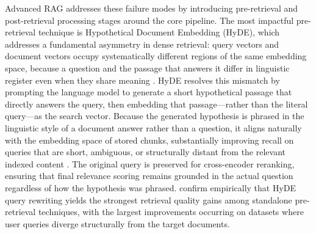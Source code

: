Advanced RAG addresses these failure modes by introducing pre-retrieval and post-retrieval processing stages around the core pipeline. The most impactful pre-retrieval technique is Hypothetical Document Embedding (HyDE), which addresses a fundamental asymmetry in dense retrieval: query vectors and document vectors occupy systematically different regions of the same embedding space, because a question and the passage that answers it differ in linguistic register even when they share meaning \cite{gao2023hyde}. HyDE resolves this mismatch by prompting the language model to generate a short hypothetical passage that directly answers the query, then embedding that passage—rather than the literal query—as the search vector. Because the generated hypothesis is phrased in the linguistic style of a document answer rather than a question, it aligns naturally with the embedding space of stored chunks, substantially improving recall on queries that are short, ambiguous, or structurally distant from the relevant indexed content \cite{gao2023hyde}. The original query is preserved for cross-encoder reranking, ensuring that final relevance scoring remains grounded in the actual question regardless of how the hypothesis was phrased.  confirm empirically that HyDE query rewriting yields the strongest retrieval quality gains among standalone pre-retrieval techniques, with the largest improvements occurring on datasets where user queries diverge structurally from the target documents.

